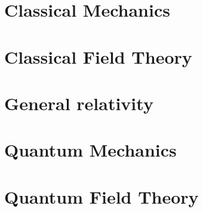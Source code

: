 \documentclass[cyan]{elegantnote}
\author{Yuyang Songsheng}
\begin{document}
\maketitle
\tableofcontents
\part{Classical Mechanics}

\part{Classical Field Theory}

\part{General relativity}

\part{Quantum Mechanics}

\part{Quantum Field Theory}

\end{document}
